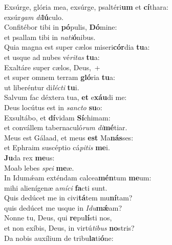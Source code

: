 \evenverse Exsúrge, glória mea, exsúrge, psaltéri\textbf{um} et \textbf{cí}thara:~\*\\
\evenverse exsúr\textit{gam} \textit{di}\textbf{lú}culo.\\
\oddverse Confitébor tibi in \textbf{pó}pulis, \textbf{Dó}mine:~\*\\
\oddverse et psallam tibi in \textit{na}\textit{ti}\textbf{ó}nibus.\\
\evenverse Quia magna est super cælos miseri\textbf{cór}dia \textbf{tu}a:~\*\\
\evenverse et usque ad nubes vé\textit{ri}\textit{tas} \textbf{tu}a:\\
\oddverse Exaltáre super cælos, Deus,~+\\
\oddverse  et super omnem terram \textbf{gló}ria \textbf{tu}a:~\*\\
\oddverse ut liberéntur di\textit{lé}\textit{cti} \textbf{tu}i.\\
\evenverse Salvum fac déxtera tua, \textbf{et} e\textbf{xáu}di me:~\*\\
\evenverse Deus locútus est in \textit{san}\textit{cto} \textbf{su}o:\\
\oddverse Exsultábo, et \textbf{dí}vidam \textbf{Sí}chimam:~\*\\
\oddverse et convállem tabernaculó\textit{rum} \textit{di}\textbf{mé}tiar.\\
\evenverse Meus est Gálaad, et meus \textbf{est} Ma\textbf{nás}ses:~\*\\
\evenverse et Ephraim suscéptio cá\textit{pi}\textit{tis} \textbf{me}i.\\
\oddverse \textbf{Ju}da rex \textbf{me}us:~\*\\
\oddverse Moab lebes \textit{spe}\textit{i} \textbf{me}æ.\\
\evenverse In Idumǽam exténdam calcea\textbf{mén}tum \textbf{me}um:~\*\\
\evenverse mihi alienígenæ a\textit{mí}\textit{ci} \textbf{fa}cti sunt.\\
\oddverse Quis dedúcet me in civi\textbf{tá}tem mu\textbf{ní}tam?~\*\\
\oddverse quis dedúcet me usque in \textit{I}\textit{du}\textbf{mǽ}am?\\
\evenverse Nonne tu, Deus, qui \textbf{re}pu\textbf{lí}sti nos,~\*\\
\evenverse et non exíbis, Deus, in virtú\textit{ti}\textit{bus} \textbf{no}stris?\\
\oddverse Da nobis auxílium de tribu\textbf{la}ti\textbf{ó}ne:~\*\\
